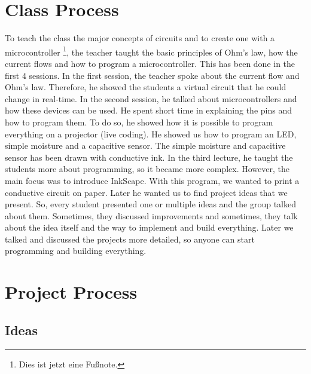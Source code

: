 \documentclass[12pt,twoside,a4paper]{article}
\begin{document}
    \section{Class Process}
    \begin{flushleft}
        To teach the class the major concepts of circuits and to create one with a microcontroller \footnote{\label{foot:microcontroller}Dies ist jetzt eine Fußnote.}, the 
        teacher taught the basic principles of Ohm's law, how the current flows and how to program a microcontroller.
        This has been done in the first 4 sessions.\newline
        In the first session, the teacher spoke about the current flow and Ohm's law. Therefore, he showed the students
        a virtual circuit that he could change in real-time.\newline
        In the second session, he talked about microcontrollers and how these devices can be used. He spent short
        time in explaining the pins and how to program them. To do so, he showed how it is possible to program
        everything on a projector (live coding). He showed us how to program an LED, simple moisture and 
        a capacitive sensor. The simple moisture and capacitive sensor has been drawn with conductive ink.\newline
        In the third lecture, he taught the students more about programming, so it became more complex. However, 
        the main focus was to introduce InkScape. With this program, we wanted to print a conductive circuit on paper.\newline
        Later he wanted us to find project ideas that we present. So, every student presented one or multiple ideas and
        the group talked about them. Sometimes, they discussed improvements and sometimes, they talk about the idea itself
        and the way to implement and build everything.
        Later we talked and discussed the projects more detailed, so anyone can start programming and building everything.
    \end{flushleft}

    \section{Project Process}
    \subsection{Ideas}
\end{document}
